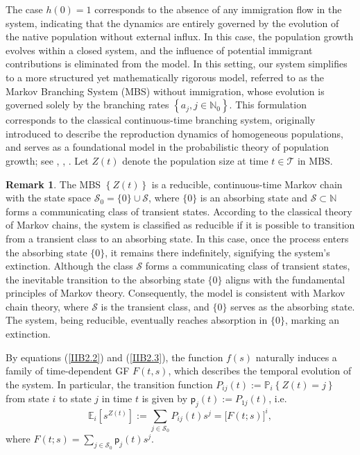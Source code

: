 \documentclass[10pt,reqno]{amsart}
\theoremstyle{definition}
\newtheorem{remark}{Remark}
\numberwithin{equation}{section}
\begin{document}
    The case $h(0)=1$ corresponds to the absence of any immigration flow in the system, indicating that the dynamics are
    entirely governed by the evolution of the native population without external influx. In this case, the population
    growth evolves within a closed system, and the influence of potential immigrant contributions is eliminated from the
    model. In this setting, our system simplifies to a more structured yet mathematically rigorous model, referred to as
    the Markov Branching System (MBS) without immigration, whose evolution is governed solely by the branching rates
    $\left\{a_{j},j\in{\mathbb{N}}_{0}\right\}$. This formulation corresponds to the classical continuous-time branching
    system, originally introduced to describe the reproduction dynamics of homogeneous populations, and serves as a
    foundational model in the probabilistic theory of population growth; see {\cite{ANey}}, {\cite{Harris63}}, {\cite{Sev71}}.
    Let $Z(t)$ denote the population size at time $t\in{\mathcal{T}}$ in MBS.
\begin{remark}                  \label{IIBRem1}
    The MBS $\left\{Z(t)\right\}$ is a reducible, continuous-time Markov chain with the state space
    ${\mathcal{S}}_{0}=\{0\}\cup{\mathcal{S}}$, where $\{0\}$ is an absorbing state and ${\mathcal{S}}\subset{\mathbb{N}}$
    forms a communicating class of transient states. According to the classical theory of Markov chains, the system is
    classified as reducible if it is possible to transition from a transient class to an absorbing state. In this case,
    once the process enters the absorbing state $\{0\}$, it remains there indefinitely, signifying the system's extinction.
    Although the class ${\mathcal{S}}$ forms a communicating class of transient states, the inevitable transition to the
    absorbing state $\{0\} $ aligns with the fundamental principles of Markov theory. Consequently, the model is consistent
    with Markov chain theory, where ${\mathcal{S}}$ is the transient class, and $\{0\}$ serves as the absorbing state.
    The system, being reducible, eventually reaches absorption in $\{0\}$,  marking an extinction.
\end{remark}

    By equations {(\ref{IIB2.2})} and {(\ref{IIB2.3})}, the function $f(s)$ naturally induces a family of
    time-dependent GF $F(t,s)$, which describes the temporal evolution of the system. In particular, the
    transition function $P_{ij}(t):={\mathbb{P}_i}\left\{Z(t)=j\right\}$ from state $i$ to state $j$ in
    time $t$ is given by $\textsf{p}_{j}(t):=P_{1j}(t)$, i.e.
\[
    {{\mathbb{E}}_{i}}\left[{s}^{Z(t)}\right]:=
    \sum_{j\in{{\mathcal{S}}_{0}}}{{P}_{ij}(t){s}^{j}}={{\bigl[F(t;s)\bigr]}^{i}},
\]
    where $F(t;s)=\sum_{j\in{\mathcal{S}}_{0}}{\textsf{p}_{j}(t){s}^{j}}$.
\end{document}

